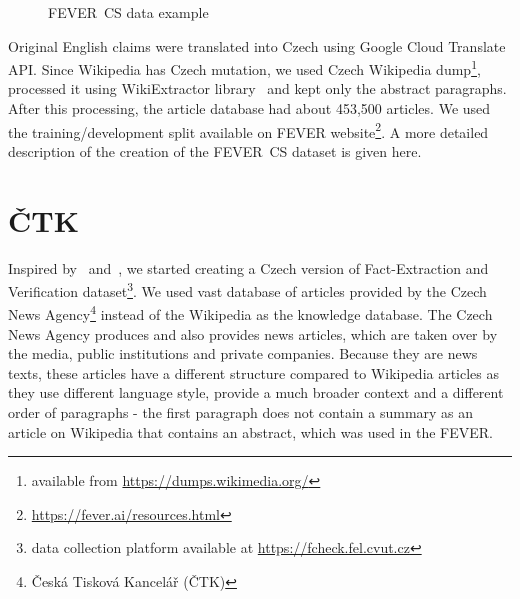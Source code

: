     \begin{figure}[H]
        \centering
        \caption{FEVER~CS data example}
        \label{fig:data-example}
    \end{figure}

    Original English claims were translated into Czech using Google Cloud Translate API. Since Wikipedia has Czech mutation, we used Czech Wikipedia dump\footnote{available from \url{https://dumps.wikimedia.org/}}, processed it using WikiExtractor library~\parencite{wikiextractor} and kept only the abstract paragraphs. After this processing, the article database had about 453,500 articles. We used the training/development split available on FEVER website\footnote{\url{https://fever.ai/resources.html}}. A more detailed description of the creation of the FEVER~CS dataset is given here.~\parencite{herbert-mt}


\section{ČTK}
\label{section:ctk-dataset}
    Inspired by~\parencite{thorne2018fever} and~\parencite{binau2020danish}, we started creating a Czech version of Fact-Extraction and Verification dataset\footnote{data collection platform available at \url{https://fcheck.fel.cvut.cz}}. We used vast database of articles provided by the Czech News Agency\footnote{Česká Tisková Kancelář (ČTK)} instead of the Wikipedia as the knowledge database. The Czech News Agency produces and also provides news articles, which are taken over by the media, public institutions and private companies. Because they are news texts, these articles have a different structure compared to Wikipedia articles as they use different language style, provide a much broader context and a different order of paragraphs - the first paragraph does not contain a summary as an article on Wikipedia that contains an abstract, which was used in the FEVER.
    
